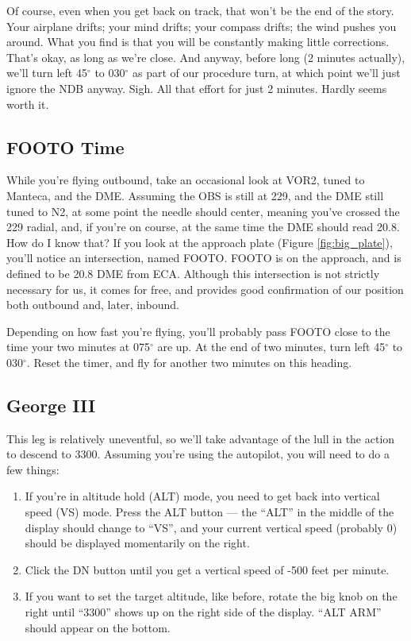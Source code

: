 Of course, even when you get back on track, that won't be the end of
the story.  Your airplane drifts; your mind drifts; your compass
drifts; the wind pushes you around.  What you find is that you will be
constantly making little corrections.  That's okay, as long as we're
close.  And anyway, before long (2 minutes actually), we'll turn left
45$^\circ$ to 030$^\circ$ as part of our procedure turn, at which
point we'll just ignore the NDB anyway.  Sigh.  All that effort for
just 2 minutes.  Hardly seems worth it.

\subsection{FOOTO Time}

While you're flying outbound, take an occasional look at VOR2, tuned
to Manteca, and the DME.  Assuming the OBS is still at 229, and the
DME still tuned to N2, at some point the needle should center, meaning
you've crossed the 229 radial, and, if you're on course, at the same
time the DME should read 20.8.  How do I know that?  If you look at
the approach plate (Figure \ref{fig:big_plate}), you'll notice an
intersection, named FOOTO.  FOOTO is on the approach, and is defined
to be 20.8 DME from ECA.  Although this intersection is not strictly
necessary for us, it comes for free, and provides good confirmation of
our position both outbound and, later, inbound.

Depending on how fast you're flying, you'll probably pass FOOTO close
to the time your two minutes at 075$^\circ$ are up.  At the end of two
minutes, turn left 45$^\circ$ to 030$^\circ$.  Reset the timer, and
fly for another two minutes on this heading.

\subsection{George III}

This leg is relatively uneventful, so we'll take advantage of the lull
in the action to descend to 3300.
Assuming you're using the autopilot, you will need to do a few things:

\begin{enumerate}
\item If you're in altitude hold (ALT) mode, you need to get back into
  vertical speed (VS) mode.  Press the ALT button --- the ``ALT'' in
  the middle of the display should change to ``VS'', and your current
  vertical speed (probably 0) should be displayed momentarily on the
  right.
\item Click the DN button until you get a vertical speed of -500 feet
  per minute.
\item If you want to set the target altitude, like before, rotate the
  big knob on the right until ``3300'' shows up on the right side of
  the display.  ``ALT ARM'' should appear on the bottom.
\end{enumerate}

